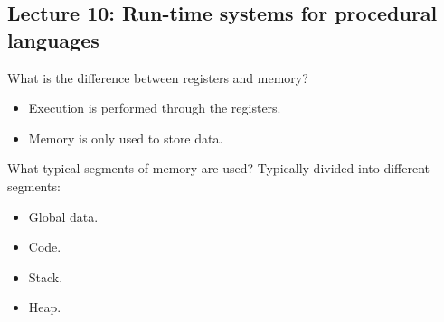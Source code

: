 \documentclass[11pt]{beamer}
\begin{document}
\subsection{Lecture 10: Run-time systems for procedural languages}
\begin{frame}
\begin{block}{What is the difference between registers and memory? }
\begin{itemize}
\item Execution is performed through the registers.
\item Memory is only used to store data.

\end{itemize}
\end{block}

\begin{block}{What typical segments of memory are used? }
Typically divided into different segments: 
\begin{itemize}
\item Global data. 
\item Code.
\item Stack.
\item Heap.

\end{itemize}
\end{block}

\end{frame}
\end{document}
